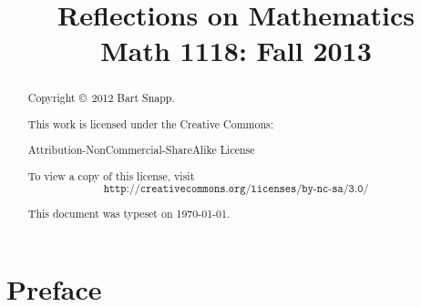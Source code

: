 

\title{
\textbf{\textsf{
\Huge Reflections on Mathematics \\
\Large Math 1118: Fall 2013
}}}
\author{}
\date{}
\maketitle



\begin{abstract}
Copyright \copyright~2012 Bart Snapp.

\vspace{.5cm}

\noindent
This work is licensed under the Creative Commons:
\begin{center}
Attribution-NonCommercial-ShareAlike License 
\end{center}
To view a copy of this license, visit
\[
\texttt{http://creativecommons.org/licenses/by-nc-sa/3.0/}
\]

\vspace{.5cm}

\noindent This document was typeset on \today.

\end{abstract}



\chapter*{Preface}


